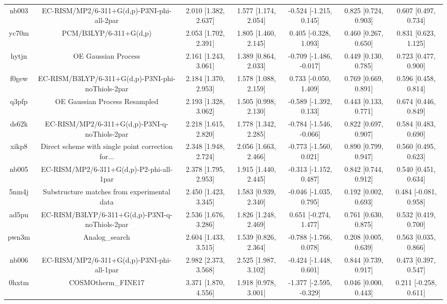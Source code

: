 \documentclass{article}
\begin{document}
\begin{center}
\begin{longtable}{|ccccccc|}
 nb003 &         EC-RISM/MP2/6-311+G(d,p)-P3NI-phi-all-2par &  2.010 [1.382, 2.637] &  1.577 [1.174, 2.054] &   -0.524 [-1.215, 0.145] &  0.825 [0.724, 0.903] &   0.607 [0.497, 0.734] \\
 yc70m &                             PCM/B3LYP/6-311+G(d,p) &  2.053 [1.702, 2.391] &  1.805 [1.460, 2.145] &    0.405 [-0.328, 1.093] &  0.460 [0.267, 0.650] &   0.831 [0.623, 1.125] \\
 hytjn &                                OE Gaussian Process &  2.161 [1.243, 3.061] &  1.389 [0.864, 2.033] &  -0.709 [-1.486, -0.017] &  0.449 [0.130, 0.785] &   0.723 [0.477, 0.900] \\
 f0gew &  EC-RISM/B3LYP/6-311+G(d,p)-P3NI-phi-noThiols-2par &  2.184 [1.370, 2.953] &  1.578 [1.088, 2.159] &    0.733 [-0.050, 1.409] &  0.769 [0.669, 0.891] &   0.596 [0.458, 0.814] \\
 q3pfp &                      OE Gaussian Process Resampled &  2.193 [1.328, 3.062] &  1.505 [0.998, 2.130] &   -0.589 [-1.392, 0.133] &  0.443 [0.133, 0.771] &   0.674 [0.446, 0.849] \\
 ds62k &      EC-RISM/MP2/6-311+G(d,p)-P3NI-q-noThiols-2par &  2.218 [1.615, 2.820] &  1.778 [1.342, 2.285] &  -0.784 [-1.546, -0.066] &  0.822 [0.697, 0.907] &   0.584 [0.483, 0.690] \\
 xikp8 &  Direct scheme with single point correction for... &  2.348 [1.948, 2.724] &  2.056 [1.663, 2.466] &   -0.773 [-1.560, 0.021] &  0.890 [0.799, 0.947] &   0.560 [0.495, 0.623] \\
 nb005 &           EC-RISM/MP2/6-311+G(d,p)-P2-phi-all-1par &  2.378 [1.795, 2.953] &  1.915 [1.440, 2.445] &   -0.313 [-1.152, 0.487] &  0.842 [0.744, 0.912] &   0.540 [0.451, 0.634] \\
 5nm4j &        Substructure matches from experimental data &  2.450 [1.423, 3.345] &  1.583 [0.939, 2.340] &   -0.046 [-1.035, 0.795] &  0.192 [0.002, 0.693] &  0.484 [-0.081, 0.958] \\
 ad5pu &    EC-RISM/B3LYP/6-311+G(d,p)-P3NI-q-noThiols-2par &  2.536 [1.676, 3.286] &  1.826 [1.248, 2.469] &    0.651 [-0.274, 1.477] &  0.761 [0.630, 0.875] &   0.532 [0.419, 0.700] \\
 pwn3m &                                     Analog\_search &  2.604 [1.433, 3.515] &  1.539 [0.826, 2.364] &   -0.788 [-1.766, 0.078] &  0.208 [0.005, 0.639] &   0.563 [0.035, 0.866] \\
 nb006 &         EC-RISM/MP2/6-311+G(d,p)-P3NI-phi-all-1par &  2.982 [2.373, 3.568] &  2.525 [1.987, 3.102] &   -0.424 [-1.448, 0.601] &  0.844 [0.739, 0.917] &   0.473 [0.397, 0.547] \\
 0hxtm &                                 COSMOtherm\_FINE17 &  3.371 [1.870, 4.556] &  1.918 [0.978, 3.001] &  -1.377 [-2.595, -0.329] &  0.046 [0.000, 0.443] &  0.211 [-0.258, 0.611] \\
\end{longtable}
\end{center}
\end{document}
